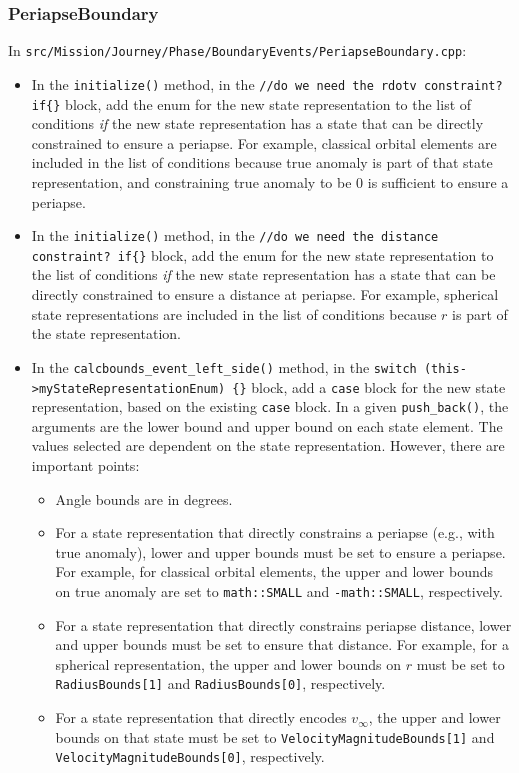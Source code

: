 \documentclass[11pt]{article}
\begin{document}
\subsubsection{PeriapseBoundary}
\label{subsubsec:periapseBoundary}

In \texttt{src/Mission/Journey/Phase/BoundaryEvents/PeriapseBoundary.cpp}:

\begin{itemize}
	\item In the \texttt{initialize()} method, in the \texttt{//do we need the rdotv constraint? if\{\}} block, add the enum for the new state representation to the list of conditions \emph{if} the new state representation has a state that can be directly constrained to ensure a periapse. For example, classical orbital elements are included in the list of conditions because true anomaly is part of that state representation, and constraining true anomaly to be 0 is sufficient to ensure a periapse.
	\item In the \texttt{initialize()} method, in the \texttt{//do we need the distance constraint? if\{\}} block, add the enum for the new state representation to the list of conditions \emph{if} the new state representation has a state that can be directly constrained to ensure a distance at periapse. For example, spherical state representations are included in the list of conditions because $r$ is part of the state representation.
	\item In the \texttt{calcbounds\_event\_left\_side()} method, in the \texttt{switch (this->myStateRepresentationEnum) \{\}} block, add a \texttt{case} block for the new state representation, based on the existing \texttt{case} block. In a given \texttt{push\_back()}, the arguments are the lower bound and upper bound on each state element. The values selected are dependent on the state representation. However, there are important points:
	\begin{itemize}
		\item Angle bounds are in degrees.
		\item For a state representation that directly constrains a periapse (e.g., with true anomaly), lower and upper bounds must be set to ensure a periapse. For example, for classical orbital elements, the upper and lower bounds on true anomaly are set to \texttt{math::SMALL} and \texttt{-math::SMALL}, respectively.
		\item For a state representation that directly constrains periapse distance, lower and upper bounds must be set to ensure that distance. For example, for a spherical representation, the upper and lower bounds on $r$ must be set to \texttt{RadiusBounds[1]} and \texttt{RadiusBounds[0]}, respectively.
		\item For a state representation that directly encodes $v_{\infty}$, the upper and lower bounds on that state must be set to \texttt{VelocityMagnitudeBounds[1]} and \texttt{VelocityMagnitudeBounds[0]}, respectively.
	\end{itemize}
\end{itemize}
\end{document}
